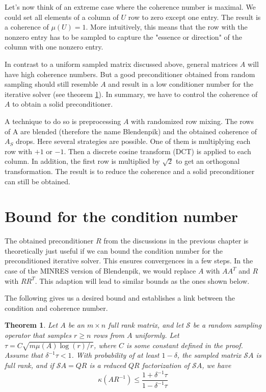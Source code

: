 \documentclass{article}
\newtheorem{theorem}{Theorem}
\begin{document}
\bigskip

Let's now think of an extreme case where the coherence number is maximal. We
could set all elements of a column of $U$ row to zero except one entry. The
result is a coherence of $\mu(U)=1$. More intuitively, this means that the row with
the nonzero entry has to be sampled to capture the "essence or direction" of
the column with one nonzero entry.

In contrast to a uniform sampled matrix discussed above, general matrices $A$
will have high coherence numbers. But a good preconditioner obtained from random sampling
should still resemble $A$ and result in a low conditioner number for the iterative
solver (see theorem \ref{thm_1}). In summary, we have to control the coherence of $A$ to
obtain a solid preconditioner.

A technique to do so is preprocessing $A$ with randomized row mixing. The rows
of A are blended (therefore the name Blendenpik) and the obtained coherence of
$A_S$ drops. Here several strategies are possible. One of them is multiplying
each row with $+1$ or $-1$. Then a discrete cosine transform (DCT) is applied
to each column. In addition, the first row is multiplied by $\sqrt{2}$ to get
an orthogonal transformation. The result is to reduce the coherence and a solid
preconditioner can still be obtained.


\section{Bound for the condition number} \label{bound}
The obtained preconditioner $R$ from
the discussions in the previous chapter is theoretically just useful if we can
bound the condition number for the preconditioned iterative solver. This
ensures convergences in a few steps. In the case of the MINRES version of
Blendenpik, we would replace $A$ with $AA^T$ and $R$ with $RR^T$. This adaption
will lead to similar bounds as the ones shown below.

The following gives us a desired bound and establishes a link between the
condition and coherence number.

\begin{theorem} \label{thm_1}
Let $A$ be an $m \times n$ full rank matrix, and let $\mathcal{S}$ be a random
sampling operator that samples $r \geq n$ rows from $A$ uniformly. Let $\tau=C
\sqrt{m \mu(A) \log (r) / r}$, where $C$ is some constant defined in the proof.
Assume that $\delta^{-1} \tau<1$. With probability of at least $1-\delta$, the
sampled matrix $\mathcal{S} A$ is full rank, and if $\mathcal{S} A=Q R$ is a
reduced $Q R$ factorization of $\mathcal{S} A$, we have
$$
\kappa\left(A R^{-1}\right) \leq \frac{1+\delta^{-1} \tau}{1-\delta^{-1} \tau}
$$
\end{theorem}
\end{document}
